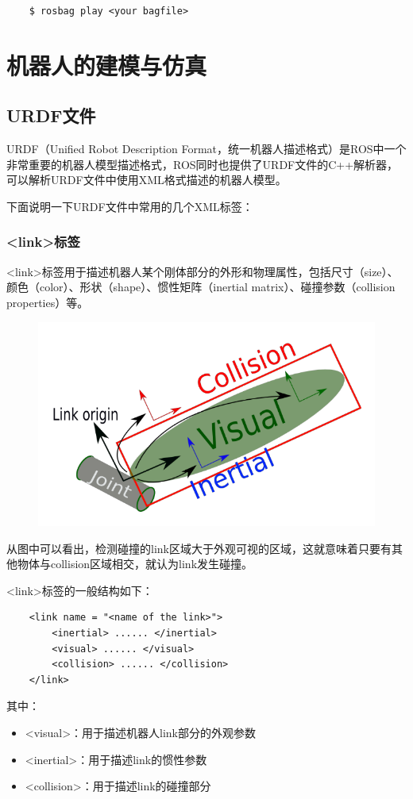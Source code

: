 \documentclass[9pt, oneside]{book}
\begin{document}
\begin{verbatim}
    $ rosbag play <your bagfile>
\end{verbatim}

\chapter{机器人的建模与仿真}

\section{URDF文件}

URDF（Unified Robot Description Format，统一机器人描述格式）是ROS中一个非常重要的机器人模型描述格式，ROS同时也提供了URDF文件的C++解析器，可以解析URDF文件中使用XML格式描述的机器人模型。

下面说明一下URDF文件中常用的几个XML标签：

\subsection{<link>标签}

<link>标签用于描述机器人某个刚体部分的外形和物理属性，包括尺寸（size）、颜色（color）、形状（shape）、惯性矩阵（inertial matrix）、碰撞参数（collision properties）等。

\begin{figure}[H]
    \centering
    \includegraphics[width = 0.4\linewidth]{image/link标签.png}
\end{figure}

从图中可以看出，检测碰撞的link区域大于外观可视的区域，这就意味着只要有其他物体与collision区域相交，就认为link发生碰撞。

<link>标签的一般结构如下：

\begin{verbatim}
    <link name = "<name of the link>">
        <inertial> ...... </inertial>
        <visual> ...... </visual>
        <collision> ...... </collision>
    </link>
\end{verbatim}

其中：
\begin{itemize}
    \item <visual>：用于描述机器人link部分的外观参数
    \item <inertial>：用于描述link的惯性参数
    \item <collision>：用于描述link的碰撞部分
\end{itemize}
\end{document}
